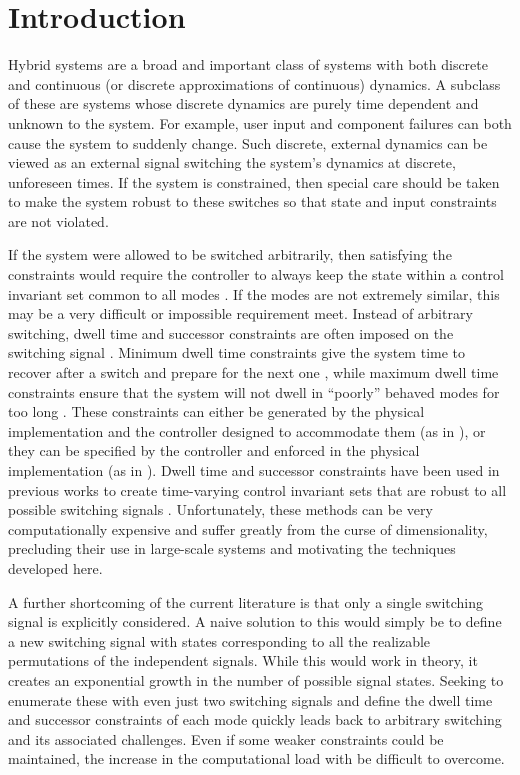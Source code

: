 \section{Introduction}
Hybrid systems are a broad and important class of systems with both discrete and continuous (or discrete approximations of continuous) dynamics. A subclass of these are systems whose discrete dynamics are purely time dependent and unknown to the system. For example, user input and component failures can both cause the system to suddenly change. Such discrete, external dynamics can be viewed as an external signal switching the system's dynamics at discrete, unforeseen times. If the system is constrained, then special care should be taken to make the system robust to these switches so that state and input constraints are not violated. 

If the system were allowed to be switched arbitrarily, then satisfying the constraints would require the controller to always keep the state within a control invariant set common to all modes \cite{Liberzon1999}. If the modes are not extremely similar, this may be a very difficult or impossible requirement meet. Instead of arbitrary switching, dwell time and successor constraints are often imposed on the switching signal \cite{Liberzon1999,Morse1999}. Minimum dwell time constraints give the system time to recover after a switch and prepare for the next one \cite{Danielson2019}, while maximum dwell time constraints ensure that the system will not dwell in ``poorly'' behaved modes for too long \cite{Hall2022}. These constraints can either be generated by the physical implementation and the controller designed to accommodate them (as in \cite{Danielson2019}), or they can be specified by the controller and enforced in the physical implementation (as in \cite{Zhang2016}). Dwell time and successor constraints have been used in previous works to create time-varying control invariant sets that are robust to all possible switching signals \cite{Danielson2019}. Unfortunately, these methods can be very computationally expensive and suffer greatly from the curse of dimensionality, precluding their use in large-scale systems and motivating the techniques developed here.

A further shortcoming of the current literature is that only a single switching signal is explicitly considered. A naive solution to this would simply be to define a new switching signal with states corresponding to all the realizable permutations of the independent signals. While this would work in theory, it creates an exponential growth in the number of possible signal states. Seeking to enumerate these with even just two switching signals and define the dwell time and successor constraints of each mode quickly leads back to arbitrary switching and its associated challenges. Even if some weaker constraints could be maintained, the increase in the computational load with be difficult to overcome.

